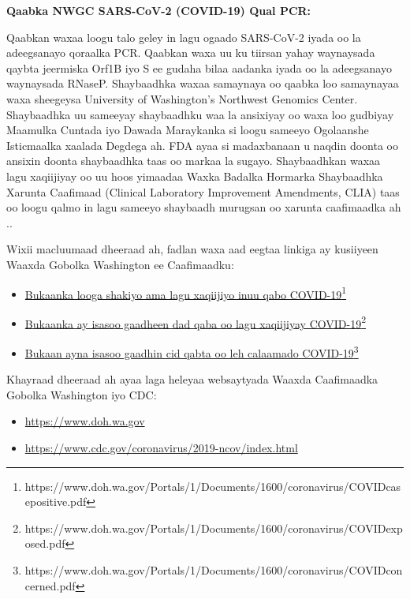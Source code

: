 \documentclass[10pt]{article}
\newcommand{\link}[2]{\href{#1}{#2}\footnote{#1}}
\begin{document}
\bigskip
\textbf{Qaabka NWGC SARS-CoV-2 (COVID-19) Qual PCR:}

Qaabkan waxaa loogu talo geley in lagu ogaado SARS-CoV-2 iyada oo la adeegsanayo
qoraalka PCR. Qaabkan waxa uu ku tiirsan yahay waynaysada qaybta jeermiska Orf1B
iyo S ee gudaha bilaa aadanka iyada oo la adeegsanayo waynaysada RNaseP.
Shaybaadhka waxaa samaynaya oo qaabka loo samaynayaa waxa sheegeysa University
of Washington’s Northwest Genomics Center.  Shaybaadhka uu sameeyay shaybaadhku
waa la ansixiyay oo waxa loo gudbiyay Maamulka Cuntada iyo Dawada Maraykanka si
loogu sameeyo Ogolaanshe Isticmaalka xaalada Degdega ah. FDA ayaa si madaxbanaan
u naqdin doonta oo ansixin doonta shaybaadhka taas oo markaa la sugayo.
Shaybaadhkan waxaa lagu xaqiijiyay oo uu hoos yimaadaa Waxka Badalka Hormarka
Shaybaadhka Xarunta Caafimaad (Clinical Laboratory Improvement Amendments, CLIA)
taas oo loogu qalmo in lagu sameeyo shaybaadh murugsan oo xarunta caafimaadka
ah ..

Wixii macluumaad dheeraad ah, fadlan waxa aad eegtaa linkiga ay kusiiyeen Waaxda
Gobolka Washington ee Caafimaadku:

\begin{itemize}
\item

  \link{https://www.doh.wa.gov/Portals/1/Documents/1600/coronavirus/COVIDcasepositive.pdf}{Bukaanka
  looga shakiyo ama lagu xaqiijiyo inuu qabo COVID-19}

\item

  \link{https://www.doh.wa.gov/Portals/1/Documents/1600/coronavirus/COVIDexposed.pdf}{Bukaanka
  ay isasoo gaadheen dad qaba oo lagu xaqiijiyay COVID-19}

\item

  \link{https://www.doh.wa.gov/Portals/1/Documents/1600/coronavirus/COVIDconcerned.pdf}{Bukaan
  ayna isasoo gaadhin cid qabta oo leh calaamado COVID-19}

\end{itemize}

Khayraad dheeraad ah ayaa laga heleyaa websaytyada Waaxda Caafimaadka Gobolka
Washington iyo CDC:

\begin{itemize}
\item

  \url{https://www.doh.wa.gov}

\item

  \url{https://www.cdc.gov/coronavirus/2019-ncov/index.html}

\end{itemize}
\end{document}
